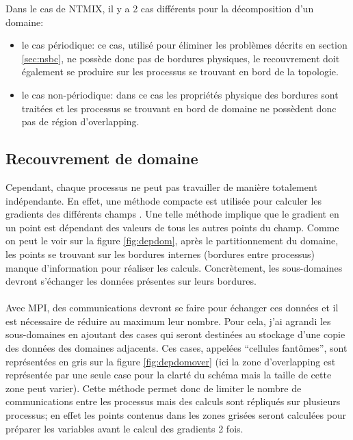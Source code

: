 Dans le cas de NTMIX, il y a 2 cas différents pour la décomposition d'un domaine:
\begin{itemize}
\item le cas périodique: ce cas, utilisé pour éliminer les problèmes décrits en section \ref{sec:nsbc}, ne possède donc pas de bordures physiques, le recouvrement doit également se produire sur les processus se trouvant en bord de la topologie.
\item le cas non-périodique: dans ce cas les propriétés physique des bordures sont traitées et les processus se trouvant en bord de domaine ne possèdent donc pas de région d'overlapping.
\end{itemize}


\subsection{Recouvrement de domaine}
Cependant, chaque processus ne peut pas travailler de manière totalement indépendante. En effet, une méthode compacte est utilisée pour calculer les gradients des différents champs \cite{Hirsch:1988:NCI:63653}. Une telle méthode implique que le gradient en un point est dépendant des valeurs de tous les autres points du champ. Comme on peut le voir sur la figure \ref{fig:depdom}, après le partitionnement du domaine, les points se trouvant sur les bordures internes (bordures entre processus) manque d'information pour réaliser les calculs. Concrètement, les sous-domaines devront s'échanger les données présentes sur leurs bordures. 

 \paragraph{}Avec MPI, des communications devront se faire pour échanger ces données et il est nécessaire de réduire au maximum leur nombre. Pour cela, j'ai agrandi les sous-domaines en ajoutant des cases qui seront destinées au stockage d'une copie des données des domaines adjacents. Ces cases, appelées ``cellules fantômes'', sont représentées en gris sur la figure \ref{fig:depdomover} (ici la zone d'overlapping est représentée par une seule case pour la clarté du schéma mais la taille de cette zone peut varier).
Cette méthode permet donc de limiter le nombre de communications entre les processus mais des calculs sont répliqués sur plusieurs processus; en effet les points contenus dans les zones grisées seront calculées pour préparer les variables avant le calcul des gradients 2 fois.



